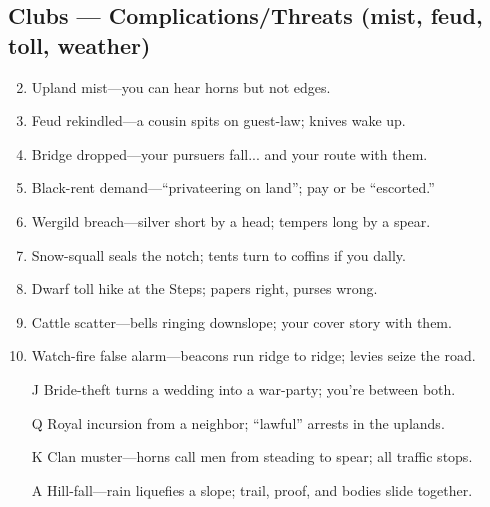 \subsection*{Clubs --- Complications/Threats (mist, feud, toll, weather)}
\label{sec:ubral-complications}
\begin{enumerate}
\setcounter{enumi}{1}
\item Upland mist---you can hear horns but not edges.
\item Feud rekindled---a cousin spits on guest-law; knives wake up.
\item Bridge dropped---your pursuers fall... and your route with them.
\item Black-rent demand---``privateering on land''; pay or be ``escorted.''
\item Wergild breach---silver short by a head; tempers long by a spear.
\item Snow-squall seals the notch; tents turn to coffins if you dally.
\item Dwarf toll hike at the Steps; papers right, purses wrong.
\item Cattle scatter---bells ringing downslope; your cover story with them.
\item Watch-fire false alarm---beacons run ridge to ridge; levies seize the road.
\item[J] Bride-theft turns a wedding into a war-party; you're between both.
\item[Q] Royal incursion from a neighbor; ``lawful'' arrests in the uplands.
\item[K] Clan muster---horns call men from steading to spear; all traffic stops.
\item[A] Hill-fall---rain liquefies a slope; trail, proof, and bodies slide together.
\end{enumerate}

